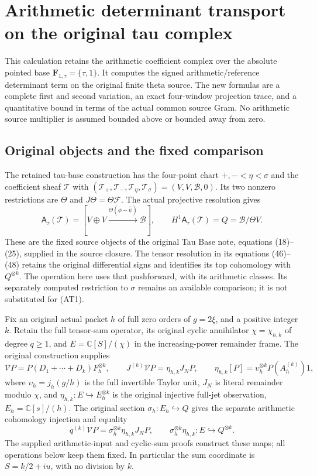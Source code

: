\begingroup
\def\C{\mathbb C}
\def\Tr{\operatorname{Tr}}
\def\im{\operatorname{im}}
\def\ar{\mathrm{ar}}
\def\Ga{\Gamma}
\def\cP{\mathcal P}
\def\cB{\mathcal B}
\def\cR{\mathcal R}
\section{Arithmetic determinant transport on the original tau complex}
This calculation retains the arithmetic coefficient complex over the
absolute pointed base $\mathbf F_{1,\tau}=\{\tau,1\}$. It computes the
signed arithmetic/reference determinant term on the original finite
theta source. The new formulas are a complete first and second variation,
an exact four-window projection trace, and a quantitative bound in terms
of the actual common source Gram. No arithmetic source multiplier is
assumed bounded above or bounded away from zero.

\subsection{Original objects and the fixed comparison}

The retained tau-base construction has the four-point chart
$+,-<\eta<\sigma$ and the coefficient sheaf $\mathcal T$ with
$(\mathcal T_+,\mathcal T_-,\mathcal T_\eta,\mathcal T_\sigma)
=(V,V,\mathscr B,0)$. Its two nonzero restrictions are $\Theta$ and
$J\Theta=\Theta\mathcal F$. The actual projective resolution gives
\[
 \mathsf A_\tau(\mathcal T)
 =[V\oplus V\xrightarrow{\Theta(\phi-\widehat\psi)}\mathscr B],
 \qquad H^1\mathsf A_\tau(\mathcal T)=Q=\mathscr B/\Theta V.
 \tag{AT1}
\]
These are the fixed source objects of the original Tau Base note,
equations (18)--(25), supplied in the source closure. The tensor
resolution in its equations (46)--(48) retains the original differential
signs and identifies its top cohomology with $Q^{\otimes k}$.
The operation here uses that pushforward, with its arithmetic classes.
Its separately computed restriction to $\sigma$ remains an available
comparison; it is not substituted for (AT1).

Fix an original actual packet $h$ of full zero orders of $g=2\xi$,
and a positive integer $k$. Retain the full tensor-sum operator,
its original cyclic annihilator $\chi=\chi_{h,k}$ of degree $q\ge1$,
and $E=\C[S]/(\chi)$ in the increasing-power remainder frame.
The original construction supplies
\[
 \mathcal V P=P(D_1+\cdots+D_k)F_h^{\otimes k},\qquad
 J^{(k)}\mathcal V P=\eta_{h,k}J_NP,\qquad
 \eta_{h,k}[P]=\upsilon_h^{\otimes k}P(A_h^{(k)})1,
 \tag{AT2}
\]
where $\upsilon_h=j_h(g/h)$ is the full invertible Taylor unit,
$J_N$ is literal remainder modulo $\chi$, and
$\eta_{h,k}:E\hookrightarrow E_h^{\otimes k}$ is the original
injective full-jet observation, $E_h=\C[s]/(h)$.
The original section $\sigma_h:E_h\hookrightarrow Q$ gives the
separate arithmetic cohomology injection and equality
\[
 q^{(k)}\mathcal V P=\sigma_h^{\otimes k}\eta_{h,k}J_NP,
 \qquad \sigma_h^{\otimes k}\eta_{h,k}:E\hookrightarrow Q^{\otimes k}.
 \tag{AT2a}
\]
The supplied arithmetic-input and cyclic-sum proofs construct these
maps; all operations below keep them fixed. In
particular the sum coordinate is $S=k/2+iu$, with no division by $k$.

